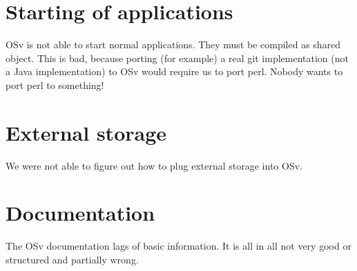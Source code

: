     \section{Starting of applications}

        OSv is not able to start normal applications. They must be compiled as
        shared object. This is bad, because porting (for example) a real git
        implementation (not a Java implementation) to OSv would require us to
        port perl. Nobody wants to port perl to something!

    \section{External storage}

        We were not able to figure out how to plug external storage into OSv.

    \section{Documentation}

        The OSv documentation lags of basic information. It is all in all not
        very good or structured and partially wrong.
